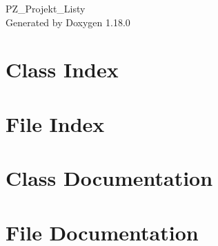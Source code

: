 \documentclass[twoside]{book}
\newcommand{\+}{\discretionary{\mbox{\scriptsize$\hookleftarrow$}}{}{}}
\newcommand{\clearemptydoublepage}{%
    \newpage{\pagestyle{empty}\cleardoublepage}%
  }
\begin{document}
  \raggedbottom
    \hypersetup{pageanchor=false,
                bookmarksnumbered=true,
                pdfencoding=unicode
               }
  \begin{titlepage}
  \vspace*{7cm}
  \begin{center}%
  {\Large PZ\+\_\+\+Projekt\+\_\+\+Listy}\\
  \vspace*{1cm}
  {\large Generated by Doxygen 1.18.0}\\
  \end{center}
  \end{titlepage}
  \clearemptydoublepage
  \tableofcontents
  \clearemptydoublepage
  \hypersetup{pageanchor=true}
\chapter{Class Index}

\chapter{File Index}

\chapter{Class Documentation}




\chapter{File Documentation}




  \backmatter
  \newpage
  \clearemptydoublepage
  \printindex
\end{document}
